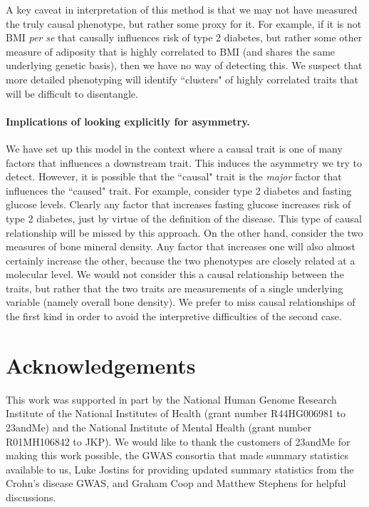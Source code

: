 \documentclass[11pt,titlepage]{article}
\begin{document}
A key caveat in interpretation of this method is that we may not have measured the truly causal phenotype, but rather some proxy for it. For example, if it is not BMI \emph{per se} that causally influences risk of type 2 diabetes, but rather some other measure of adiposity that is highly correlated to BMI (and shares the same underlying genetic basis), then we have no way of detecting this. We suspect that more detailed phenotyping will identify ``clusters" of highly correlated traits that will be difficult to disentangle.  

\paragraph{Implications of looking explicitly for asymmetry.}

We have set up this model in the context where a causal trait is one of many factors that influences a downstream trait. This induces the asymmetry we try to detect. However, it is possible that the ``causal" trait is the \emph{major} factor that influences the ``caused" trait. For example, consider type 2 diabetes and fasting glucose levels. Clearly any factor that increases fasting glucose increases risk of type 2 diabetes, just by virtue of the definition of the disease. This type of causal relationship will be missed by this approach. On the other hand, consider the two measures of bone mineral density. Any factor that increases one will also almost certainly increase the other, because the two phenotypes are closely related at a molecular level. We would not consider this a causal relationship between the traits, but rather that the two traits are measurements of a single underlying variable (namely overall bone density). We prefer to miss causal relationships of the first kind in order to avoid the interpretive difficulties of the second case.
\section{Acknowledgements}
This work was supported in part by the National Human Genome Research Institute of the National Institutes of Health (grant number R44HG006981 to 23andMe) and the National Institute of Mental Health (grant number R01MH106842 to JKP). We would like to thank the customers of 23andMe for making this work possible, the GWAS consortia that made summary statistics available to us, Luke Jostins for providing updated summary statistics from the Crohn's disease GWAS, and Graham Coop and Matthew Stephens for helpful discussions.
\end{document}
